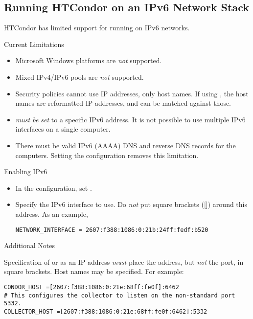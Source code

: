 \subsection{\label{sec:ipv6}Running HTCondor on an IPv6 Network Stack}

HTCondor has limited support for running on IPv6 networks.

Current Limitations

\begin{itemize}
    \item{Microsoft Windows platforms are \emph{not} supported.}
    \item{Mixed IPv4/IPv6 pools are \emph{not} supported.}
    \item{Security policies cannot use IP addresses, only host names.
If using , the host names are reformatted IP addresses,
and can be matched against those. }
    \item{ \emph{must be set} to a 
specific IPv6 address. 
It is not possible to use multiple IPv6 interfaces on a single computer.}
    \item{There must be valid IPv6 (AAAA) DNS and reverse DNS records for 
the computers. 
Setting the configuration  removes this limitation.}
\end{itemize}

Enabling IPv6

\begin{itemize}
    \item{In the configuration, set .}
    \item{Specify the IPv6 interface to use. 
Do \emph{not} put square brackets ([]) around this address.
As an example,
\begin{verbatim}
NETWORK_INTERFACE = 2607:f388:1086:0:21b:24ff:fedf:b520
\end{verbatim}
}
\end{itemize}

Additional Notes

Specification of   or 
as an IP address \emph{must} place the address, 
but \emph{not} the port, in square brackets. 
Host names may be specified. 
For example:

\begin{verbatim}
CONDOR_HOST =[2607:f388:1086:0:21e:68ff:fe0f]:6462
# This configures the collector to listen on the non-standard port 5332.
COLLECTOR_HOST =[2607:f388:1086:0:21e:68ff:fe0f:6462]:5332
\end{verbatim}

